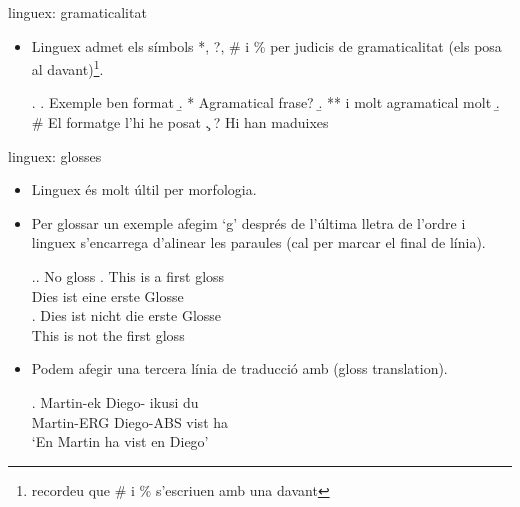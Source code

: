 \begin{frame}[fragile]{linguex: gramaticalitat}
\begin{itemize}
    \item Linguex admet els símbols *, ?, \# i \% per judicis de gramaticalitat (els posa al davant)\footnote{recordeu que \# i \% s'escriuen amb una \keystroke{\textbackslash} davant}.
\begin{exampletwouptiny2}
\ex.
\a. Exemple ben format
\b. * Agramatical frase?
\b. ** i molt agramatical molt
\b. \# El formatge l'hi he posat
\c. ? Hi han maduixes

\end{exampletwouptiny2}
\end{itemize}

\end{frame}

\begin{frame}[fragile]{linguex: glosses}
\begin{itemize}
\item Linguex és molt últil per morfologia.
\item Per glossar un exemple afegim `g' després de l'última lletra de l'ordre i linguex s'encarrega d'alinear les paraules (cal \keystrokebftt{\bs\bs}  per marcar el final de línia).
\begin{exampletwouptiny2}
\ex.\a. No gloss
\bg. This is a first gloss\\
Dies ist eine erste Glosse\\

\exg.
Dies ist nicht die erste Glosse\\
This is not the first gloss\\

\end{exampletwouptiny2}
\item Podem afegir una tercera línia de traducció amb  (gloss translation).
\begin{exampletwouptiny2}
\exg.
Martin-ek Diego-\zero{} ikusi du \\
Martin-ERG Diego-ABS vist ha \\
\glt `En Martin ha vist en Diego'

\end{exampletwouptiny2}
\end{itemize}

\end{frame}

